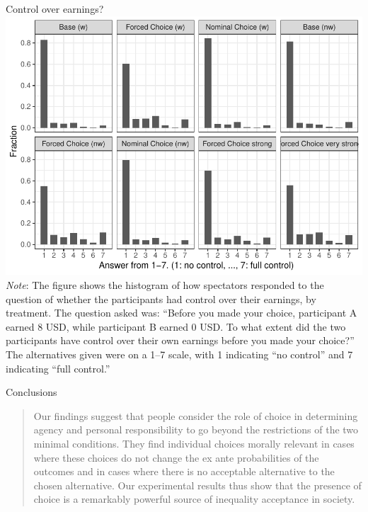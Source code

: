 \documentclass{beamer}
\begin{document}
\begin{frame}{Control over earnings?}
	\includegraphics[height=.70\textheight]{../graphs/control_earnings.pdf}
	{\tiny
		\emph{Note}: The figure shows the histogram of how spectators responded to the question
		of whether the participants had control over their earnings, by treatment. The question
		asked was: “Before you made your choice, participant A earned 8 USD, while participant B earned 0 USD. To what extent did the two participants have control over their own earnings before you made your choice?” The alternatives given were on a 1–7 scale, with 1 indicating “no control” and 7 indicating “full control.”
	}
\end{frame}
	\begin{frame}{Conclusions}

	\begin{block}

		\begin{quote}
			Our findings suggest that people consider the role of choice in determining agency
			and personal responsibility to go beyond the restrictions of the two minimal conditions.
			They find individual choices morally relevant in cases where these choices do
			not change the ex ante probabilities of the outcomes and in cases where there is no
			acceptable alternative to the chosen alternative. Our experimental results thus show
			that the presence of choice is a remarkably powerful source of inequality acceptance
			in society.
		\end{quote}

	\end{block}

\end{frame}
\end{document}
